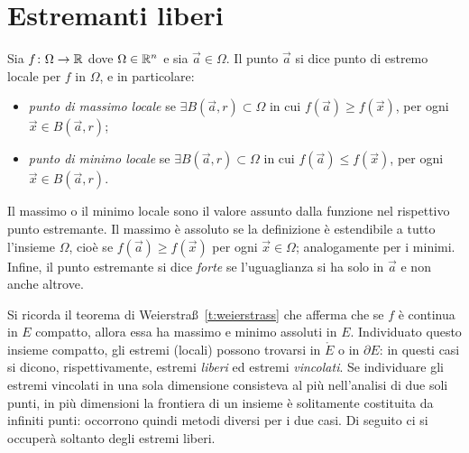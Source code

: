 \section{Estremanti liberi}
\begin{definizione}
Sia $f\colon\Omega\to\mathbb{R}$ dove $\Omega\in\mathbb{R}^n$ e sia $\vec a\in\Omega$. Il punto $\vec a$ si dice punto di estremo locale per $f$ in $\Omega$, e in particolare:
\begin{itemize}
\item \emph{punto di massimo locale} se $\exists B(\vec a,r)\subset\Omega$ in cui $f(\vec a)\geq f(\vec x)$, per ogni $\vec x\in B(\vec a,r)$;
\item \emph{punto di minimo locale} se $\exists B(\vec a,r)\subset\Omega$ in cui $f(\vec a)\leq f(\vec x)$, per ogni $\vec x\in B(\vec a,r)$.
\end{itemize}
\end{definizione}
Il massimo o il minimo locale sono il valore assunto dalla funzione nel rispettivo punto estremante. Il massimo è assoluto se la definizione è estendibile a tutto l'insieme $\Omega$, cioè se $f(\vec a)\geq f(\vec x)$ per ogni $\vec x\in\Omega$; analogamente per i minimi.
Infine, il punto estremante si dice \emph{forte} se l'uguaglianza si ha solo in $\vec a$ e non anche altrove.

Si ricorda il teorema di Weierstra\ss\ \ref{t:weierstrass} che afferma che se $f$ è continua in $E$ compatto, allora essa ha massimo e minimo assoluti in $E$. Individuato questo insieme compatto, gli estremi (locali) possono trovarsi in $\mathring{E}$ o in $\partial E$: in questi casi si dicono, rispettivamente, estremi \emph{liberi} ed estremi \emph{vincolati}. Se individuare gli estremi vincolati in una sola dimensione consisteva al più nell'analisi di due soli punti, in più dimensioni la frontiera di un insieme è solitamente costituita da infiniti punti: occorrono quindi metodi diversi per i due casi.
Di seguito ci si occuperà soltanto degli estremi liberi.

